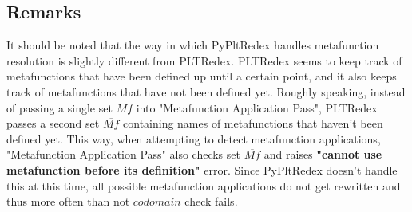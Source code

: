 \subsection{Remarks}
It should be noted that the way in which PyPltRedex handles metafunction resolution is slightly different from PLTRedex. PLTRedex seems to keep track of metafunctions that have been defined up until a certain point, and it also keeps track of metafunctions that have not been defined yet. Roughly speaking, instead of passing a single set $Mf$ into "Metafunction Application Pass", PLTRedex passes a second set $\overline{Mf}$ containing names of metafunctions that haven't been defined yet. This way, when attempting to detect metafunction applications, "Metafunction Application Pass" also checks set $\overline{Mf}$ and raises \textbf{"cannot use metafunction before its definition"} error. Since PyPltRedex doesn't handle this at this time, all possible metafunction applications do not get rewritten and thus more often than not $codomain$ check fails.
